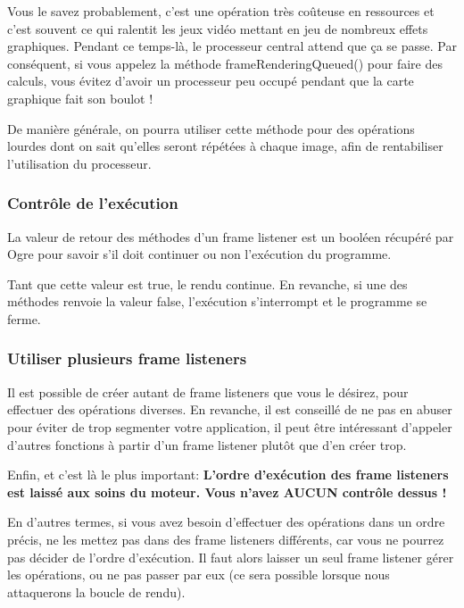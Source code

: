 \documentclass[10pt,a4paper]{report}
\begin{document}
Vous le savez probablement, c'est une op\'eration tr\`es co\^uteuse en ressources et c'est souvent ce qui ralentit les jeux vid\'eo mettant en jeu de nombreux effets graphiques. Pendant ce temps-l\`{a}, le processeur central attend que \c{c}a se passe. Par cons\'equent, si vous appelez la m\'ethode frameRenderingQueued() pour faire des calculs, vous \'evitez d'avoir un processeur peu occup\'e pendant que la carte graphique fait son boulot !

De mani\`ere g\'en\'erale, on pourra utiliser cette m\'ethode pour des op\'erations lourdes dont on sait qu'elles seront r\'ep\'et\'ees \`{a} chaque image, afin de rentabiliser l'utilisation du processeur.




\subsubsection{Contr\^ole de l'ex\'ecution}

La valeur de retour des m\'ethodes d'un frame listener est un bool\'een r\'ecup\'er\'e par Ogre pour savoir s'il doit continuer ou non l'ex\'ecution du programme.

Tant que cette valeur est true, le rendu continue. En revanche, si une des m\'ethodes renvoie la valeur false, l'ex\'ecution s'interrompt et le programme se ferme.



\subsubsection{Utiliser plusieurs frame listeners}

Il est possible de cr\'eer autant de frame listeners que vous le d\'esirez, pour effectuer des op\'erations diverses. En revanche, il est conseill\'e de ne pas en abuser pour \'eviter de trop segmenter votre application, il peut \^etre int\'eressant d'appeler d'autres fonctions \`{a} partir d'un frame listener plut\^ot que d'en cr\'eer trop.

Enfin, et c'est l\`{a} le plus important:
\textbf{L'ordre d'ex\'ecution des frame listeners est laiss\'e aux soins du moteur. Vous n'avez AUCUN contr\^ole dessus !}

En d'autres termes, si vous avez besoin d'effectuer des op\'erations dans un ordre pr\'ecis, ne les mettez pas dans des frame listeners diff\'erents, car vous ne pourrez pas d\'ecider de l'ordre d'ex\'ecution. Il faut alors laisser un seul frame listener g\'erer les op\'erations, ou ne pas passer par eux (ce sera possible lorsque nous attaquerons la boucle de rendu).
\end{document}
